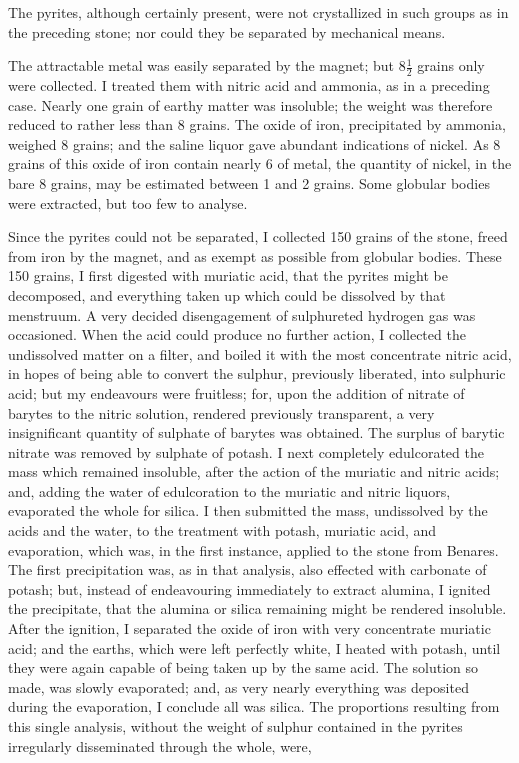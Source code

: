 \documentclass[a4paper, 12pt, oneside]{article}
\begin{document}
The pyrites, although certainly present, were not crystallized in such groups as in the preceding stone; nor could they be separated by mechanical means.

The attractable metal was easily separated by the magnet; but $8\frac{1}{2}$ grains only were collected. I treated them with nitric acid and ammonia, as in a preceding case. Nearly one grain of earthy matter was insoluble; the weight was therefore reduced to rather less than 8 grains. The oxide of iron, precipitated by ammonia, weighed 8 grains; and the saline liquor gave abundant indications of nickel. As 8 grains of this oxide of iron contain nearly 6 of metal, the quantity of nickel, in the bare 8 grains, may be estimated between 1 and 2 grains. Some globular bodies were extracted, but too few to analyse.

Since the pyrites could not be separated, I collected 150 grains of the stone, freed from iron by the magnet, and as exempt as possible from globular bodies. These 150 grains, I first digested with muriatic acid, that the pyrites might be decomposed, and everything taken up which could be dissolved by that menstruum. A very decided disengagement of sulphureted hydrogen gas was occasioned. When the acid could produce no further action, I collected the undissolved matter on a filter, and boiled it with the most concentrate nitric acid, in hopes of being able to convert the sulphur, previously liberated, into sulphuric acid; but my endeavours were fruitless; for, upon the addition of nitrate of barytes to the nitric solution, rendered previously transparent, a very insignificant quantity of sulphate of barytes was obtained. The surplus of barytic nitrate was removed by sulphate of potash. I next completely edulcorated the mass which remained insoluble, after the action of the muriatic and nitric acids; and, adding the water of edulcoration to the muriatic and nitric liquors, evaporated the whole for silica. I then submitted the mass, undissolved by the acids and the water, to the treatment with potash, muriatic acid, and evaporation, which was, in the first instance, applied to the stone from Benares. The first precipitation was, as in that analysis, also effected with carbonate of potash; but, instead of endeavouring immediately to extract alumina, I ignited the precipitate, that the alumina or silica remaining might be rendered insoluble. After the ignition, I separated the oxide of iron with very concentrate muriatic acid; and the earths, which were left perfectly white, I heated with potash, until they were again capable of being taken up by the same acid. The solution so made, was slowly evaporated; and, as very nearly everything was deposited during the evaporation, I conclude all was silica. The proportions resulting from this single analysis, without the weight of sulphur contained in the pyrites irregularly disseminated through the whole, were,
\end{document}
